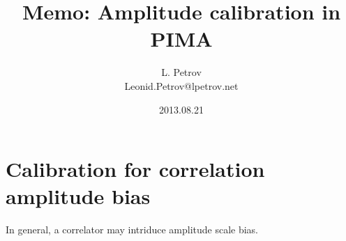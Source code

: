 \documentclass[11pt]{article}
\title { \vspace{-6.0ex}  \LARGE\bf Memo: Amplitude calibration in PIMA}
\author{ {\large\sc L. Petrov} \\
         {\small Leonid.Petrov@lpetrov.net }
       }
\date{2013.08.21}
\begin{document}
\maketitle

\section{Calibration for correlation amplitude bias}

In general, a correlator may intriduce amplitude scale bias.
\end{document}
